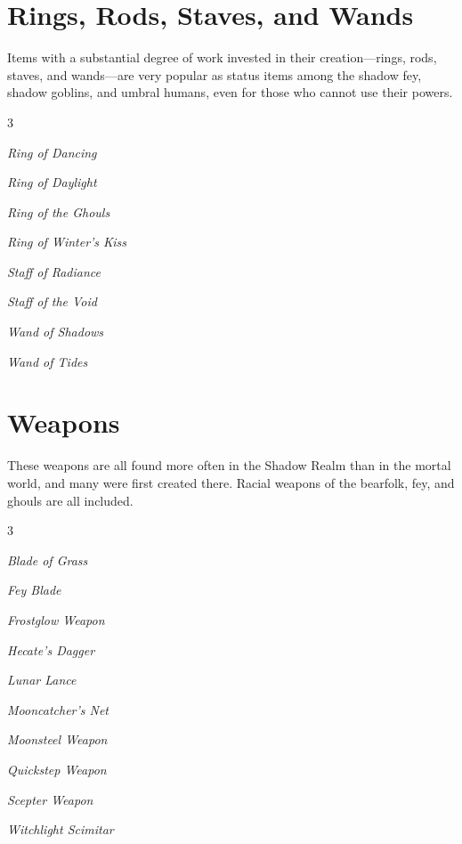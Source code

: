 \documentclass[10pt,a4paper,twoside,bg=print,twocolumn,openany,nodeprecatedcode]{dndbook}
\begin{document}
\section{Rings, Rods, Staves, and Wands}
Items with a substantial degree of work invested in their creation—rings, rods, staves, and wands—are very popular as status items among the shadow fey, shadow goblins, and umbral humans, even for those who cannot use their powers.


\begin{itemize}
\begin{multicols}{3}
\item \textit{Ring of Dancing}
\item \textit{Ring of Daylight}
\item \textit{Ring of the Ghouls}
\item \textit{Ring of Winter's Kiss}
\item \textit{Staff of Radiance}
\item \textit{Staff of the Void}
\item \textit{Wand of Shadows}
\item \textit{Wand of Tides}
\end{multicols}

\end{itemize}

\section{Weapons}
These weapons are all found more often in the Shadow Realm than in the mortal world, and many were first created there. Racial weapons of the bearfolk, fey, and ghouls are all included.


\begin{itemize}
\begin{multicols}{3}
\item \textit{Blade of Grass}
\item \textit{Fey Blade}
\item \textit{Frostglow Weapon}
\item \textit{Hecate's Dagger}
\item \textit{Lunar Lance}
\item \textit{Mooncatcher's Net}
\item \textit{Moonsteel Weapon}
\item \textit{Quickstep Weapon}
\item \textit{Scepter Weapon}
\item \textit{Witchlight Scimitar}
\end{multicols}

\end{itemize}
\end{document}
